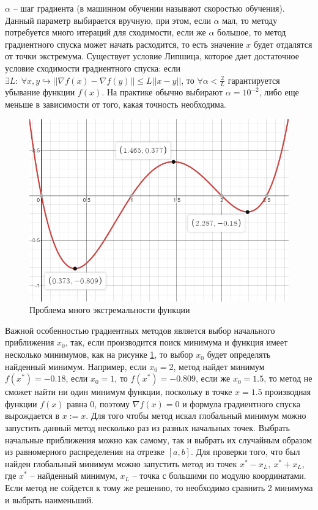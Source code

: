 $\alpha$ -- шаг градиента (в машинном обучении называют скоростью обучения). Данный параметр выбирается вручную, при этом, если $\alpha$ мал, то методу потребуется много итераций для сходимости, если же $\alpha$ большое, то метод градиентного спуска может начать расходится, то есть значение $x$ будет отдалятся от точки экстремума. Существует условие Липшица, которое дает достаточное условие сходимости градиентного спуска: если $\exists L:~\forall x, y \hookrightarrow || \nabla f(x) - \nabla f(y) || \leq L || x - y ||$, то $\forall \alpha < \frac{2}{L}$ гарантируется убывание функции $f(x)$. На практике обычно выбирают $\alpha=10^{-2}$, либо еще меньше в зависимости от того, какая точность необходима.

\begin{figure} 
    \vspace{-3ex}
    \includegraphics[width=\linewidth]{src/img/multi_extreme.png}
    \caption{Проблема много экстремальности функции}
    \label{fig:multi_extreme}
\end{figure}

Важной особенностью градиентных методов является выбор начального приближения $x_0$, так, если производится поиск минимума и функция имеет несколько минимумов, как на рисунке \ref{fig:multi_extreme}, то выбор $x_0$ будет определять найденный минимум. Например, если $x_0 = 2$, метод найдет минимум $f(x^*) = -0.18$, если $x_0 = 1$, то $f(x^*) = -0.809$, если же $x_0 = 1.5$, то метод не сможет найти ни один минимум функции, поскольку в точке $x = 1.5$ производная функции $f(x)$ равна 0, поэтому $\nabla f(x) = 0$ и формула градиентного спуска вырождается в $x := x$. Для того чтобы метод искал глобальный минимум можно запустить данный метод несколько раз из разных начальных точек. Выбрать начальные приближения можно как самому, так и выбрать их случайным образом из равномерного распределения на отрезке $[ a, b ]$. Для проверки того, что был найден глобальный минимум можно запустить метод из точек $x^* - x_L,~x^* + x_L$, где $x^*$ -- найденный минимум, $x_L$ -- точка с большими по модулю координатами. Если метод не сойдется к тому же решению, то необходимо сравнить 2 минимума и выбрать наименьший.


